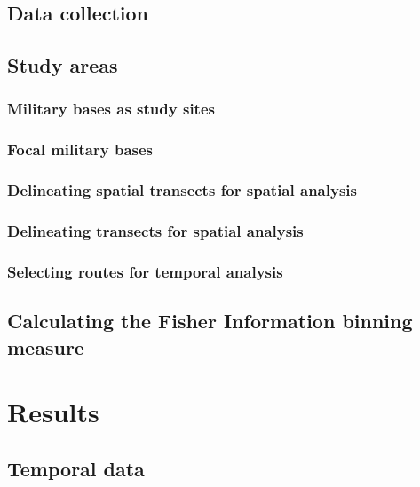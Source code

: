 \documentclass[12pt,twoside]{reedthesis}
\begin{document}
\subsection{Data collection}\label{data-collection}

\subsection{Study areas}\label{study-areas}

\subsubsection{Military bases as study
sites}\label{military-bases-as-study-sites}

\subsubsection{Focal military bases}\label{focal-military-bases}

\subsubsection{Delineating spatial transects for spatial
analysis}\label{delineating-spatial-transects-for-spatial-analysis}

\subsubsection{Delineating transects for spatial
analysis}\label{delineating-transects-for-spatial-analysis}

\subsubsection{Selecting routes for temporal
analysis}\label{selecting-routes-for-temporal-analysis}

\subsection{Calculating the Fisher Information binning
measure}\label{calculating-the-fisher-information-binning-measure}

\section{Results}\label{results-1}

\subsection{Temporal data}\label{temporal-data}
\end{document}
